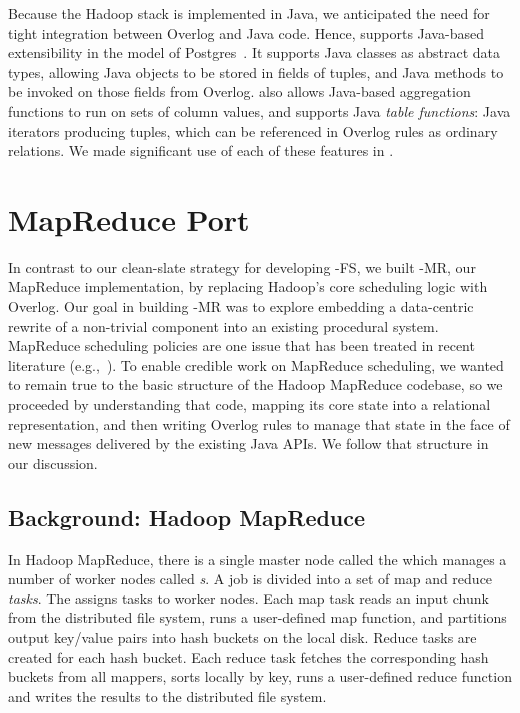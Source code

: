 Because the Hadoop stack is implemented in Java, we anticipated the need for
tight integration between Overlog and Java code. Hence, \JOL supports Java-based
extensibility in the model of Postgres~\cite{postgres}.  It supports Java
classes as abstract data types, allowing Java objects to be stored in fields of
tuples, and Java methods to be invoked on those fields from Overlog.  \JOL also
allows Java-based aggregation functions to run on sets of column values, and
supports Java \emph{table functions}: Java iterators producing tuples, which can
be referenced in Overlog rules as ordinary relations. We made significant use of
each of these features in \BOOMA.


\section{MapReduce Port}
\label{sec:mr}
In contrast to our clean-slate strategy for developing \BOOM-FS, we built
\BOOM-MR, our MapReduce implementation, by replacing Hadoop's core scheduling
logic with Overlog. Our goal in building \BOOM-MR was to explore embedding a
data-centric rewrite of a non-trivial component into an existing procedural
system.  MapReduce scheduling policies are one issue that has been treated in
recent literature (e.g.,~\cite{late-sched,delay-sched}).  To enable credible
work on MapReduce scheduling, we wanted to remain true to the basic structure of
the Hadoop MapReduce codebase, so we proceeded by understanding that code,
mapping its core state into a relational representation, and then writing
Overlog rules to manage that state in the face of new messages delivered by the
existing Java APIs.  We follow that structure in our discussion.

\subsection{Background: Hadoop MapReduce}
In Hadoop MapReduce, there is a single master node called the \emph{\JT} which
manages a number of worker nodes called \emph{{\TT}s}.  A job is divided into a
set of map and reduce \emph{tasks}. The {\JT} assigns tasks to worker nodes.  Each
map task reads an input chunk from the distributed file system, runs a
user-defined map function, and partitions output key/value pairs into hash
buckets on the local disk.  Reduce tasks are created for each hash
bucket.  Each reduce task fetches the corresponding hash buckets from all
mappers, sorts locally by key, runs a user-defined reduce function and writes
the results to the distributed file system.


